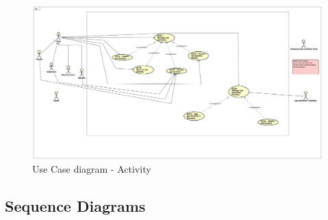 				\begin{figure}[H]
					\includegraphics[width=\linewidth]{diagrams/uc-diag4-activity.png}
					\caption{Use Case diagram - Activity}
					\label{fig:uc_diag_4_activity}
				\end{figure}
			
			\eject

			\subsection{Sequence Diagrams}
								
